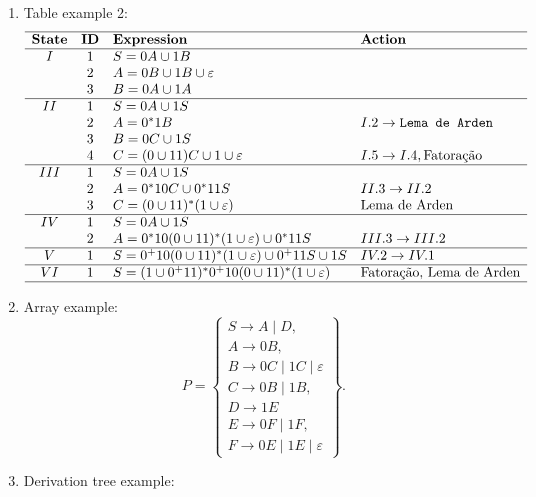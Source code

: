 \documentclass[12pt,a4paper]{article}
\begin{document}
\begin{enumerate}
\item Table example 2:
  $$
  \begin{array}{ccll}
  \hline
  \textbf{State} & \textbf{ID} & \textbf{Expression} & \textbf{Action}\\
  \hline
    I & 1 & S = 0A \cup 1B           &\\
      & 2 & A = 0B \cup 1B \cup \varepsilon          &\\
      & 3 & B = 0A \cup 1A           &\\
  \hline
   II & 1 & S = 0A \cup 1S                 &\\
      & 2 & A = 0^*1B                      & I.2 \to \texttt{Lema de Arden}\\
      & 3 & B = 0C \cup 1S                 &\\
      & 4 & C = (0\cup 11)C \cup 1\cup \varepsilon & I.5 \to I.4, \text{Fatoração}\\
  \hline
  III & 1 & S = 0A \cup 1S              &\\
      & 2 & A = 0^*10C\cup 0^*11S       & II.3 \to II.2\\
      & 3 & C = (0\cup 11)^*(1\cup \varepsilon) & \text{Lema de Arden}\\
  \hline
   IV & 1 & S = 0A \cup 1S                              &\\
      & 2 & A = 0^*10(0\cup 11)^*(1\cup \varepsilon)\cup 0^*11S & III.3 \to III.2\\
  \hline
    V & 1 & S = 0^+10(0\cup 11)^*(1\cup \varepsilon)\cup 0^+11S \cup 1S & IV.2 \to IV.1\\
  \hline
   VI & 1 & S = (1\cup 0^+11)^*0^+10(0\cup 11)^*(1\cup \varepsilon) & \text{Fatoração, Lema de Arden}\\ 
   \hline
  \end{array}
  $$
  
\item  Array example:
  $$ 
   P =
   \left\{\begin{array}{l}
    S \to A \mid D,\\
    A \to 0B,\\
    B \to 0C \mid 1C \mid \varepsilon \\
    C \to 0B \mid 1B,\\
    D \to 1E\\
    E \to 0F \mid 1F,\\
    F \to 0E \mid 1E \mid \varepsilon
   \end{array}\right\}.
  $$
 \item Derivation tree example:
 

\end{enumerate}
\end{document}

